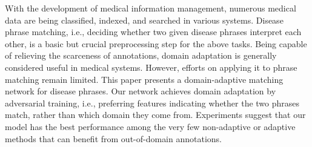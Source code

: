With the development of medical information management, numerous medical data are being classified, indexed, and searched in various systems. Disease phrase matching, i.e., deciding whether two given disease phrases interpret each other, is a basic but crucial preprocessing step for the above tasks. Being capable of relieving the scarceness of annotations, domain adaptation is generally considered useful in medical systems. However, efforts on applying it to phrase matching remain limited. This paper presents a domain-adaptive matching network for disease phrases. Our network achieves domain adaptation by adversarial training, i.e., preferring features indicating whether the two phrases match, rather than which domain they come from. Experiments suggest that our model has the best performance among the very few non-adaptive or adaptive methods that can benefit from out-of-domain annotations.
